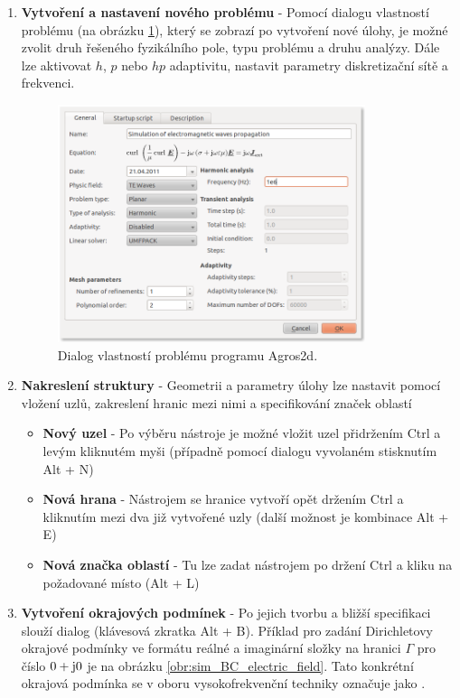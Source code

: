 \begin{enumerate}
\item {\bf Vytvoření a nastavení nového problému} - Pomocí dialogu vlastností problému (na obrázku \ref{obr:sim_problem_properties}), který se zobrazí po vytvoření nové úlohy, je možné zvolit druh řešeného fyzikálního pole, typu problému a druhu analýzy. Dále lze aktivovat $h$, $p$ nebo $hp$ adaptivitu, nastavit parametry diskretizační sítě a frekvenci.
\begin{figure}[!h]
	\centering
	\includegraphics[width=9cm]{sim_problem_properties.png}
	\caption{Dialog vlastností problému programu Agros2d.}
	\label{obr:sim_problem_properties}
\end{figure}
\item {\bf Nakreslení struktury} - Geometrii a parametry úlohy lze nastavit pomocí vložení uzlů, zakreslení hranic mezi nimi a specifikování značek oblastí
\begin{itemize}
\item {\bf Nový uzel} - Po výběru nástroje  je možné vložit uzel přidržením Ctrl a levým kliknutém myši (případně pomocí dialogu vyvolaném stisknutím Alt + N)
\item {\bf Nová hrana} - Nástrojem  se hranice vytvoří opět držením Ctrl a kliknutím mezi dva již vytvořené uzly (další možnost je kombinace Alt + E)
\item {\bf Nová značka oblastí} - Tu lze zadat nástrojem  po držení Ctrl a kliku na požadované místo (Alt + L)
\end{itemize}
\item {\bf Vytvoření okrajových podmínek} - Po jejich tvorbu a bližší specifikaci slouží dialog  (klávesová zkratka Alt + B). Příklad pro zadání Dirichletovy okrajové podmínky ve formátu reálné a imaginární složky na hranici $\Gamma$ pro číslo $0 + \mathrm{j} 0$ je na obrázku \ref{obr:sim_BC_electric_field}. Tato konkrétní okrajová podmínka se v oboru vysokofrekvenční techniky označuje jako .

\end{enumerate}
